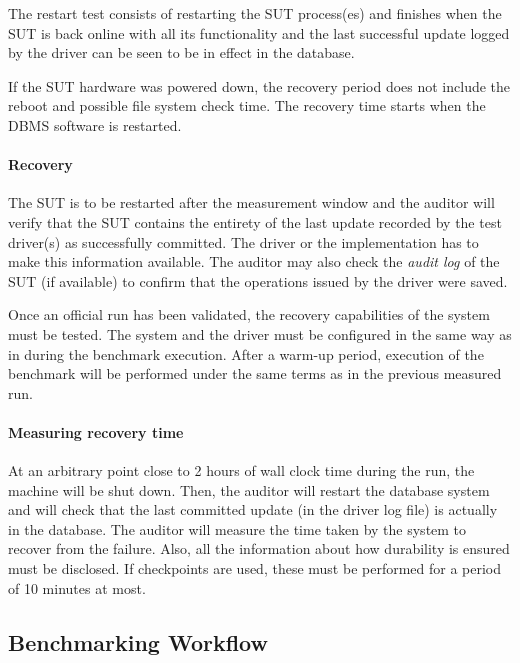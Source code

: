 The restart test consists of restarting the SUT process(es) and finishes when the SUT is back online with all its functionality and the last successful update logged by the driver can be seen to be in effect in the database.

If the SUT hardware was powered down, the recovery period does not include the reboot and possible file system check time. The recovery time starts when the DBMS software is restarted.




\paragraph{Recovery} 
The SUT is to be restarted after the measurement window and the auditor will verify that the SUT contains the entirety of the last update recorded by the test driver(s) as successfully committed. The driver or the implementation has to make this information available. The auditor may also check the \emph{audit log} of the SUT (if available) to confirm that the operations issued by the driver were saved.

Once an official run has been validated, the recovery capabilities of the system must be tested. The system and the driver must be configured in the same way as in during the benchmark execution. After a warm-up period, execution of the benchmark will be performed under the same terms as in the previous measured run.

\paragraph{Measuring recovery time}
At an arbitrary point close to 2 hours of wall clock time during the run, the machine will be shut down. Then, the auditor will restart the database system and will check that the last committed update (in the driver log file) is actually in the database. The auditor will measure the time taken by the system to recover from the failure. Also, all the information about how durability is ensured must be disclosed. If checkpoints are used, these must be performed for a period of 10 minutes at most.


\subsection{Benchmarking Workflow}
\label{sec:transaction-workload-benchmark-workflow}

